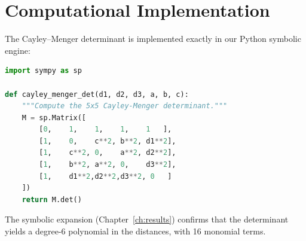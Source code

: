 \section{Computational Implementation}

The Cayley--Menger determinant is implemented exactly in our Python symbolic engine:

\begin{lstlisting}[language=Python, basicstyle=\ttfamily\small, backgroundcolor=\color{codebg}]
import sympy as sp

def cayley_menger_det(d1, d2, d3, a, b, c):
    """Compute the 5x5 Cayley-Menger determinant."""
    M = sp.Matrix([
        [0,    1,    1,    1,    1   ],
        [1,    0,    c**2, b**2, d1**2],
        [1,    c**2, 0,    a**2, d2**2],
        [1,    b**2, a**2, 0,    d3**2],
        [1,    d1**2,d2**2,d3**2, 0   ]
    ])
    return M.det()
\end{lstlisting}

The symbolic expansion (Chapter~\ref{ch:results}) confirms that the determinant yields a degree-6 polynomial in the distances, with 16 monomial terms.
